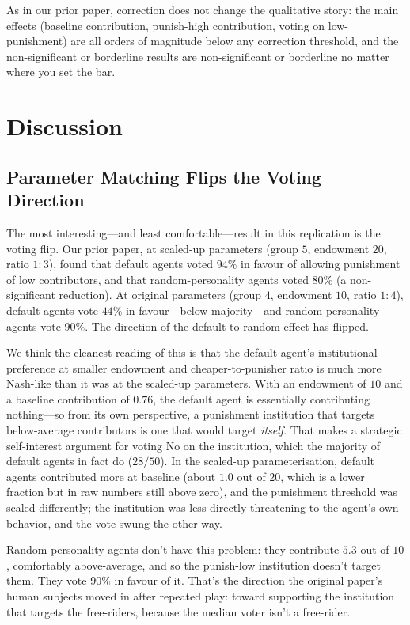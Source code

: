 \documentclass[12pt, a4paper]{article}
\begin{document}
As in our prior paper, correction does not change the qualitative story: the main effects (baseline contribution, punish-high contribution, voting on low-punishment) are all orders of magnitude below any correction threshold, and the non-significant or borderline results are non-significant or borderline no matter where you set the bar.

\section{Discussion}

\subsection{Parameter Matching Flips the Voting Direction}

The most interesting---and least comfortable---result in this replication is the voting flip. Our prior paper, at scaled-up parameters (group $5$, endowment $20$, ratio $1{:}3$), found that default agents voted $94\%$ in favour of allowing punishment of low contributors, and that random-personality agents voted $80\%$ (a non-significant reduction). At original parameters (group $4$, endowment $10$, ratio $1{:}4$), default agents vote $44\%$ in favour---below majority---and random-personality agents vote $90\%$. The direction of the default-to-random effect has flipped.

We think the cleanest reading of this is that the default agent's institutional preference at smaller endowment and cheaper-to-punisher ratio is much more Nash-like than it was at the scaled-up parameters. With an endowment of $10$ and a baseline contribution of $0.76$, the default agent is essentially contributing nothing---so from its own perspective, a punishment institution that targets below-average contributors is one that would target \emph{itself}. That makes a strategic self-interest argument for voting No on the institution, which the majority of default agents in fact do ($28/50$). In the scaled-up parameterisation, default agents contributed more at baseline (about $1.0$ out of $20$, which is a lower fraction but in raw numbers still above zero), and the punishment threshold was scaled differently; the institution was less directly threatening to the agent's own behavior, and the vote swung the other way.

Random-personality agents don't have this problem: they contribute $5.3$ out of $10$, comfortably above-average, and so the punish-low institution doesn't target them. They vote $90\%$ in favour of it. That's the direction the original paper's human subjects moved in after repeated play: toward supporting the institution that targets the free-riders, because the median voter isn't a free-rider.
\end{document}
